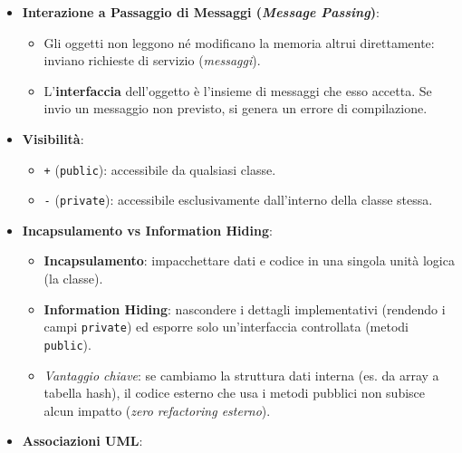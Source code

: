 \documentclass[11pt,a4paper,oneside]{report}
\newcommand{\passthrough}[1]{#1}
\providecommand{\tightlist}{\setlength{\itemsep}{0pt}\setlength{\parskip}{0pt}}
\begin{document}
\begin{itemize}
\begin{itemize}
    \begin{itemize}
    \tightlist
    \item
      Es. \passthrough{\lstinline!Car1: Car!} con
      \passthrough{\lstinline!manufacturer = DeLorean!},
      \passthrough{\lstinline!model = DMC-12!}.
    \end{itemize}
  \end{itemize}
\item
  \textbf{Interazione a Passaggio di Messaggi (\emph{Message Passing})}:

  \begin{itemize}
  \tightlist
  \item
    Gli oggetti non leggono né modificano la memoria altrui
    direttamente: inviano richieste di servizio (\emph{messaggi}).
  \item
    L'\textbf{interfaccia} dell'oggetto è l'insieme di messaggi che esso
    accetta. Se invio un messaggio non previsto, si genera un errore di
    compilazione.
  \end{itemize}
\item
  \textbf{Visibilità}:

  \begin{itemize}
  \tightlist
  \item
    \passthrough{\lstinline!+!} (\passthrough{\lstinline!public!}):
    accessibile da qualsiasi classe.
  \item
    \passthrough{\lstinline!-!} (\passthrough{\lstinline!private!}):
    accessibile esclusivamente dall'interno della classe stessa.
  \end{itemize}
\item
  \textbf{Incapsulamento vs Information Hiding}:

  \begin{itemize}
  \tightlist
  \item
    \textbf{Incapsulamento}: impacchettare dati e codice in una singola
    unità logica (la classe).
  \item
    \textbf{Information Hiding}: nascondere i dettagli implementativi
    (rendendo i campi \passthrough{\lstinline!private!}) ed esporre solo
    un'interfaccia controllata (metodi
    \passthrough{\lstinline!public!}).
  \item
    \emph{Vantaggio chiave}: se cambiamo la struttura dati interna (es.
    da array a tabella hash), il codice esterno che usa i metodi
    pubblici non subisce alcun impatto (\emph{zero refactoring
    esterno}).
  \end{itemize}
\item
  \textbf{Associazioni UML}:


\end{itemize}
\end{document}
